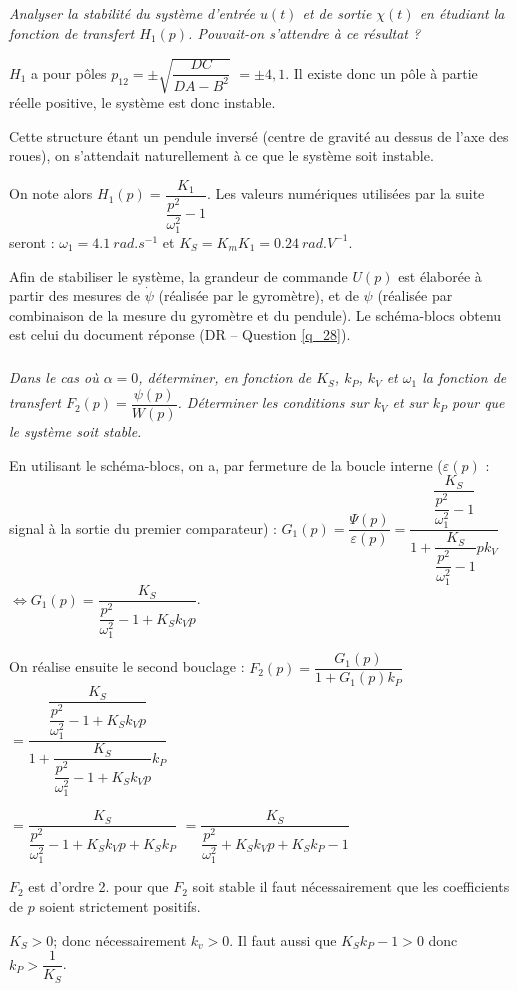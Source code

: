 \documentclass[10pt,fleqn]{article} %
\begin{document}

\subparagraph{\label{q_24}}\textit{Analyser la stabilité du système d’entrée $u(t)$ et de sortie $\chi(t)$ en étudiant la fonction de transfert  $H_1(p)$. Pouvait-on s'attendre à ce résultat ?}
\ifprof
\begin{corrige}
$H_1$ a pour pôles $p_{12}=\pm\sqrt{\dfrac{DC}{DA-B^2}}$ $=\pm 4,1$. Il existe donc un pôle à partie réelle positive, le système est donc instable. 

Cette structure étant un pendule inversé (centre de gravité au dessus de l'axe des roues), on s'attendait naturellement à ce que le système soit instable.

\end{corrige}
\else
\fi


\ifprof
\else
On note alors $H_1(p)=\dfrac{K_1}{\dfrac{p^2}{\omega_1^2}-1}$. Les valeurs numériques utilisées par la suite seront : $\omega_1=\SI{4,1}{rad.s^{-1}}$  et $K_S=K_mK_1 = \SI{0,24}{rad.V^{-1}}$.

Afin de stabiliser le système, la grandeur de commande $U(p)$ est élaborée à partir des mesures de $\dot{\psi}$ (réalisée par le gyromètre), et de ${\psi}$  (réalisée par combinaison de la mesure du gyromètre et du pendule).  Le schéma-blocs obtenu est celui du document réponse (DR -- Question \ref{q_28}).
\fi


\subparagraph{\label{q_25}}\textit{Dans le cas où $\alpha=0$, déterminer, en fonction de $K_S$, $k_P$, $k_V$ et $\omega_1$  la fonction de transfert $F_2(p)=\dfrac{\psi(p)}{W(p)}$. Déterminer les conditions sur $k_V$ et sur $k_P$ pour que le système soit stable.}
\ifprof
\begin{corrige}
En utilisant le schéma-blocs, on a, par fermeture de la boucle interne ($\varepsilon(p)$ : signal à la sortie du premier comparateur) :
$G_1(p)= \dfrac{\Psi(p)}{\varepsilon(p)} = \dfrac{\dfrac{K_S}{\dfrac{p^2}{\omega_1^2}-1}}{1+\dfrac{K_S}{\dfrac{p^2}{\omega_1^2}-1}pk_V}$
$\Leftrightarrow G_1(p)  = \dfrac{K_S}{{\dfrac{p^2}{\omega_1^2}-1}+K_Sk_Vp}$.

On réalise ensuite le second bouclage : $F_2(p)=\dfrac{G_1(p)}{1+G_1(p)k_P}$
$ =\dfrac{ \dfrac{K_S}{{\dfrac{p^2}{\omega_1^2}-1}+K_Sk_Vp}}{1+ \dfrac{K_S}{{\dfrac{p^2}{\omega_1^2}-1}+K_Sk_Vp}k_P} $

$ =\dfrac{K_S}{{\dfrac{p^2}{\omega_1^2}-1+K_Sk_Vp}    + K_Sk_P} $
$ =\dfrac{K_S}{{\dfrac{p^2}{\omega_1^2}+K_Sk_Vp}    + K_Sk_P-1} $

$F_2$ est d'ordre 2. pour que $F_2$ soit stable il faut nécessairement que les coefficients de $p$ soient strictement positifs. 

$K_S>0$; donc nécessairement $k_v>0$. Il faut aussi que $K_Sk_P-1>0$ donc $k_P >\dfrac{1}{K_S}$.

\end{corrige}
\else
\fi
\end{document}
